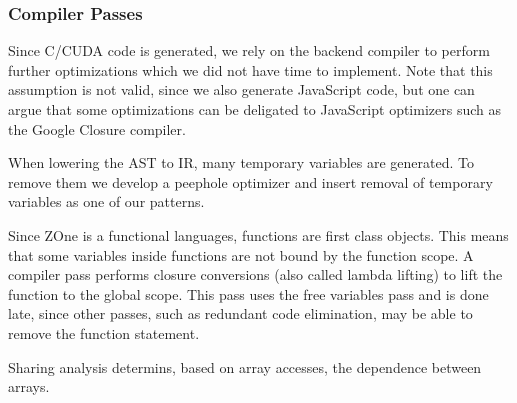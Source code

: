 \subsubsection{Compiler Passes}

Since C/CUDA code is generated, we rely on the backend compiler
	to perform further optimizations which we did not have time
	to implement.
Note that this assumption is not valid, since we also generate
	JavaScript code, but one can argue that some optimizations
	can be deligated to JavaScript optimizers such as the 
	Google Closure compiler. 


When lowering the AST to IR, many temporary variables are generated.
To remove them we develop a peephole optimizer and insert removal of
	temporary variables as one of our patterns.






Since ZOne is a functional languages, functions are 
	first class objects.
This means that some variables inside functions are not
	bound by the function scope.
A compiler pass performs closure conversions (also called
	lambda lifting) to lift the function to the global scope.
This pass uses the free variables pass and is done late,
	since other passes, such as 
	redundant code elimination, may be able to remove the
	function statement.


Sharing analysis determins, based on array accesses, the 
	dependence between arrays.

